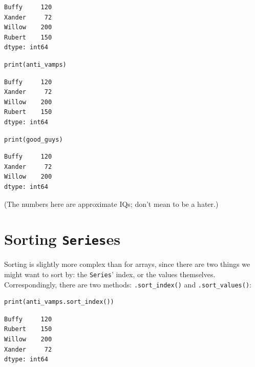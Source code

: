 \begin{Verbatim}[fontsize=\CBCodeSmall,samepage=true,frame=leftline,framesep=5mm,framerule=1mm]
Buffy     120
Xander     72
Willow    200
Rubert    150
dtype: int64
\end{Verbatim}

\begin{Verbatim}[fontsize=\CBCodeSmall,samepage=true,frame=single,framesep=3mm]
print(anti_vamps)
\end{Verbatim}
\vspace{-.3in}

\begin{Verbatim}[fontsize=\CBCodeSmall,samepage=true,frame=leftline,framesep=5mm,framerule=1mm]
Buffy     120
Xander     72
Willow    200
Rubert    150
dtype: int64
\end{Verbatim}

\begin{Verbatim}[fontsize=\CBCodeSmall,samepage=true,frame=single,framesep=3mm]
print(good_guys)
\end{Verbatim}
\vspace{-.3in}

\begin{Verbatim}[fontsize=\CBCodeSmall,samepage=true,frame=leftline,framesep=5mm,framerule=1mm]
Buffy     120
Xander     72
Willow    200
dtype: int64
\end{Verbatim}

(The numbers here are approximate IQs; don't mean to be a hater.)


\section{Sorting \texttt{Series}es}

Sorting is slightly more complex than for arrays, since there are two things we
might want to sort by: the \texttt{Series}' index, or the values themselves.
Correspondingly, there are two methods: \texttt{.sort\_index()} and
\texttt{.sort\_values()}:

\begin{Verbatim}[fontsize=\small,samepage=true,frame=single,framesep=3mm]
print(anti_vamps.sort_index())
\end{Verbatim}
\vspace{-.3in}

\begin{Verbatim}[fontsize=\small,samepage=true,frame=leftline,framesep=5mm,framerule=1mm]
Buffy     120
Rubert    150
Willow    200
Xander     72
dtype: int64
\end{Verbatim}

